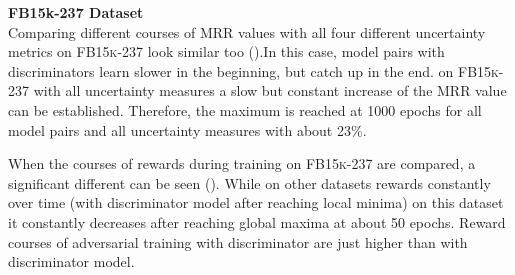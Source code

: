 \textbf{FB15k-237 Dataset}
\label{subsubsec:measures_fb15k237}\\
%
Comparing different courses of MRR values with all four different uncertainty metrics on \textsc{FB15k-237} look similar too ().In this case, model pairs with \transd discriminators learn slower in the beginning, but catch up in the end.
on \textsc{FB15k-237} with all uncertainty measures a slow but constant increase of the MRR value can be established.
Therefore, the maximum is reached at 1000 epochs for all model pairs and all uncertainty measures with about 23\%.

When the courses of rewards during training on \textsc{FB15k-237} are compared, a significant different can be seen ().
While on other datasets rewards constantly over time (with \transd discriminator model after reaching local minima) on this dataset it constantly decreases after reaching global maxima at about 50 epochs.
Reward courses of adversarial training with \transe discriminator are just higher than with \transd discriminator model.
